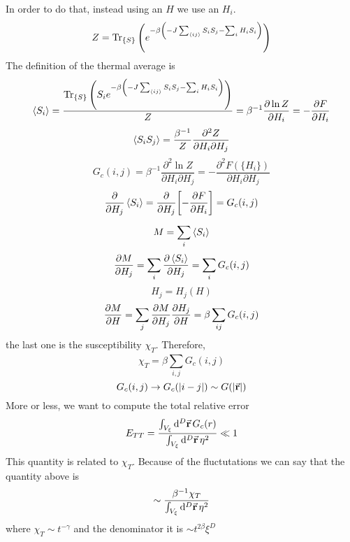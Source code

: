 \documentclass[../main/main.tex]{subfiles}
\begin{document}
In order to do that, instead using an \( H \) we use an \( H_i \).
\begin{equation}
  Z = \Tr_{\{ S \} } \qty(e^{-\beta \qty(-J \sum_{\expval{ij} }^{} S_i S_j   - \sum_{i}^{} H_i S_i ) } )
\end{equation}
The definition of the thermal average is
\begin{equation}
  \expval{S_i} = \frac{\Tr_{\{ S \} } \qty(S_i e^{-\beta \qty(-J \sum_{\expval{ij} }^{} S_i S_j   - \sum_{i}^{} H_i S_i ) } ) }{Z}
  = \beta ^{-1} \pdv{\ln{Z} }{H_i} = - \pdv{F}{H_i}
\end{equation}
\begin{equation}
  \expval{S_i S_j} = \frac{\beta ^{-1}}{Z} \frac{\partial^2{Z} }{\partial{H_i} \partial{H_j}  }
\end{equation}
\begin{equation}
  G_c (i,j) = \beta ^{-1} \frac{\partial^2{\ln{Z} } }{\partial{H_i} \partial{H_j}  }
  = - \frac{\partial^2{F(\{ H_i \}  )} }{\partial{H_i} \partial{H_j}  }
\end{equation}
\begin{equation}
  \pdv{}{H_j} \expval{S_i} = \pdv{}{H_j} \qty[-\pdv{F}{H_i} ] = G_c (i,j)
\end{equation}
\begin{equation}
  M = \sum_{i}^{} \expval{S_i}
\end{equation}
\begin{equation}
  \pdv{M}{H_j} = \sum_{i}^{} \pdv{\expval{S_i} }{H_j} = \sum_{i}^{} G_c (i,j)
\end{equation}
\begin{equation}
  H_j = H_j (H)
\end{equation}
\begin{equation}
  \pdv{M}{H} = \sum_{j}^{} \pdv{M}{H_j} \pdv{H_j}{H}
  =  \beta \sum_{ij}^{} G_c (i,j)
\end{equation}
the last one is the susceptibility \( \chi _T \).
 Therefore,
 \begin{equation}
   \chi _T = \beta \sum_{i,j}^{} G_c (i,j)
 \end{equation}
 \begin{equation}
   G_c (i,j) \rightarrow G_c (\abs{i-j} ) \sim G (\abs{\va{r}} )
 \end{equation}
More or less, we want to compute the total relative error
\begin{equation}
  E_{TT} = \frac{\int_{V_ \xi }^{ } \dd[D]{\va{r}}  G_c (r)}{ \int_{V_ \xi }^{} \dd[D]{\va{r}} \eta ^2 } \ll 1
\end{equation}
This quantity is related to \( \chi _T \). Because of the fluctutations we can say that the quantity above is
\begin{equation}
  \sim  \frac{\beta ^{-1} \chi _T }{ \int_{V_ \xi }^{} \dd[D]{\va{r}} \eta ^2 }
\end{equation}
where \( \chi _T \sim t^{-\gamma  } \) and  the denominator it is \(  \sim t^{2 \beta } \xi ^D\)
\end{document}
